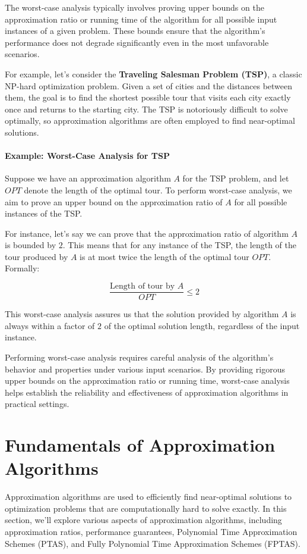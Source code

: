 \documentclass[12pt]{book} %
\begin{document}
The worst-case analysis typically involves proving upper bounds on the approximation ratio or running time of the algorithm for all possible input instances of a given problem. These bounds ensure that the algorithm's performance does not degrade significantly even in the most unfavorable scenarios.

For example, let's consider the \textbf{Traveling Salesman Problem (TSP)}, a classic NP-hard optimization problem. Given a set of cities and the distances between them, the goal is to find the shortest possible tour that visits each city exactly once and returns to the starting city. The TSP is notoriously difficult to solve optimally, so approximation algorithms are often employed to find near-optimal solutions.

\paragraph{Example: Worst-Case Analysis for TSP}

Suppose we have an approximation algorithm \(A\) for the TSP problem, and let \(OPT\) denote the length of the optimal tour. To perform worst-case analysis, we aim to prove an upper bound on the approximation ratio of \(A\) for all possible instances of the TSP.

For instance, let's say we can prove that the approximation ratio of algorithm \(A\) is bounded by \(2\). This means that for any instance of the TSP, the length of the tour produced by \(A\) is at most twice the length of the optimal tour \(OPT\). Formally:

\[
\frac{\text{Length of tour by } A}{OPT} \leq 2
\]

This worst-case analysis assures us that the solution provided by algorithm \(A\) is always within a factor of \(2\) of the optimal solution length, regardless of the input instance.

Performing worst-case analysis requires careful analysis of the algorithm's behavior and properties under various input scenarios. By providing rigorous upper bounds on the approximation ratio or running time, worst-case analysis helps establish the reliability and effectiveness of approximation algorithms in practical settings.


\section{Fundamentals of Approximation Algorithms}

Approximation algorithms are used to efficiently find near-optimal solutions to optimization problems that are computationally hard to solve exactly. In this section, we'll explore various aspects of approximation algorithms, including approximation ratios, performance guarantees, Polynomial Time Approximation Schemes (PTAS), and Fully Polynomial Time Approximation Schemes (FPTAS).
\end{document}

